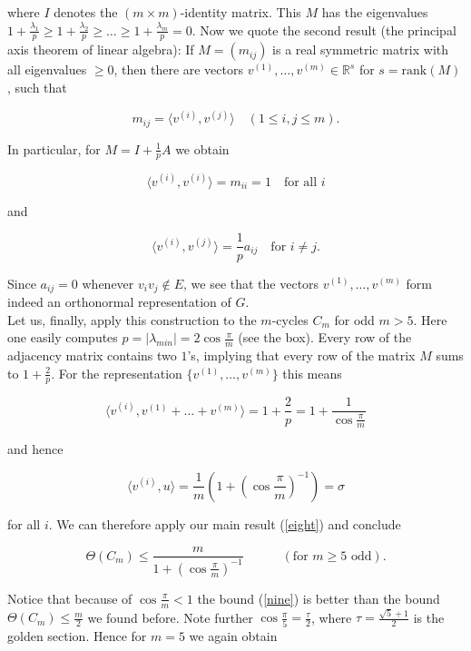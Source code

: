 \documentclass[openany,12pt]{memoir}
\newcommand{\setnewpagemargins}{
    \clearpage
    \setulmarginsandblock{2cm}{0.5cm}{*}
    \checkandfixthelayout
}
\begin{document}
where $I$ denotes the $(m \times m)$-identity matrix. This $M$ has the eigenvalues
$1+{\frac{\lambda_1}{p}} \geq 1+{\frac{\lambda_2}{p}} \geq \ldots \geq 1+{\frac{\lambda_m}{p}} =0$. Now we quote the second result (the principal axis theorem of linear algebra):
If $M = (m_{ij})$ is a real symmetric matrix with all eigenvalues $\geq 0$,
then there are vectors $v^{(1)}, \ldots, v^{(m)} \in \mathbb{R}^s$
for $s = \text{rank}(M)$, such that 

\[
m_{ij} = \langle v^{(i)}, v^{(j)} \rangle  \quad  (1 \leq i,j \leq m).
\]

In particular, for $M = I + {\frac{1}{p}}A$ we obtain

\[
\langle v^{(i)}, v^{(i)} \rangle = m_{ii} = 1  \quad \text{for all }i
\]

and

\[
\langle v^{(i)}, v^{(j)} \rangle = {\frac{1}{p}}a_{ij} \quad \text{for }i \neq j.
\]

Since $a_{ij} = 0 $ whenever $ v_i v_j \notin E$, we see that the 
vectors $v^{(1)},\ldots,v^{(m)}$ form indeed an orthonormal representation of $G$.\\[5pt]
Let us, finally, apply this construction to the $m$-cycles $C_m$ for odd $m > 5$. 
Here one easily computes $p = |\lambda_{min}| = 2\cos{\frac{\pi}{m}}$ (see the box). Every 
row of the adjacency matrix contains two $1$'s, implying that every row of 
the matrix $M$ sums to $1 + {\frac{2}{p}}$. For the representation $\{ v^{(1)}, \ldots, v^{(m)}\}$ this
means

\[ 
    \langle v^{(i)},v^{(1)}+ \ldots + v^{(m)} \rangle=1+{\frac{2}{p}}=1+{\frac{1}{\cos{\frac{\pi}{m}}}}
\]

and hence 
\vspace{-20pt}

\[
\langle v^{(i)},u \rangle = {\frac{1}{m}}(1+(\cos{\frac{\pi}{m}})^{-1})=\sigma
\]

for all $i$. We can therefore apply our main result (\ref{eight}) and conclude

\begin{equation}
    \Theta(C_m) \leq {\frac{m}{1+(\cos{\frac{\pi}{m}})^{-1}}} \quad\quad\quad (\text{for $m \geq 5$ odd}).\label{nine}    
\end{equation}


\setnewpagemargins

Notice that because of $\cos{\frac{\pi}{m}} < 1$ the bound (\ref{nine}) is better than the bound 
$\Theta(C_m) \leq {\frac{m}{2}}$ we found before. Note further $\cos{\frac{\pi}{5}} = {\frac{\tau}{2}}$, where $\tau = {\frac{\sqrt{5}+1}{2}}$
is the golden section. Hence for $m = 5$ we again obtain
\end{document}
